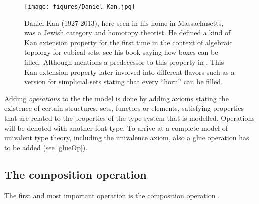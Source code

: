 \documentclass[12pt,a4paper,twoside,xetex]{book}
\newcommand{\keyword}[1]{\emph{#1}\index{#1}}
\begin{document}
\begin{figure}
\begin{centering}
\texttt{[image: figures/Daniel\_Kan.jpg]}
\par\end{centering}
\caption{\label{fig:Kan}Daniel Kan (1927-2013), here seen in his home in Massachusetts, was a Jewish category and homotopy theorist. He defined  a kind of Kan extension property for the first time in the context of algebraic topology for cubical sets, see his book \cite{Kan1955} saying how boxes can be filled. Although \cite{Coquand2019} mentions a predecessor to this property in \cite{Eilenberg1939}. This Kan extension property later involved into different flavors such as a version for simplicial sets stating that every ``horn'' can be filled.}
\end{figure}

Adding \keyword{operations} to the the model is done by adding axioms stating the existence of certain structures, sets, functors or elements, satisfying properties that are related to the properties of the type system that is modelled. Operations will be denoted with another font type. To arrive at a complete model of univalent type theory, including the univalence axiom, also a glue operation has to be added (see \cref{glueOp}). 

\subsection{The composition operation}

The first and most important operation is the composition operation \cite{Orton2019}. 
\end{document}

